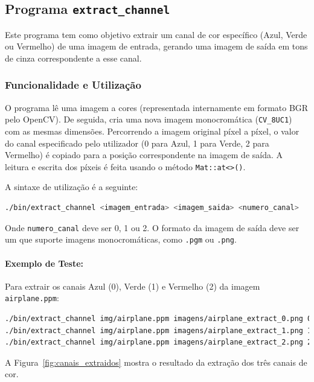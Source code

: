 \documentclass[a4paper, 11pt, portuguese]{article}
\begin{document}
\subsection{Programa \texttt{extract\_channel}}

Este programa tem como objetivo extrair um canal de cor específico (Azul, Verde ou Vermelho) de uma imagem de entrada, gerando uma imagem de saída em tons de cinza correspondente a esse canal.

\subsubsection{Funcionalidade e Utilização}
O programa lê uma imagem a cores (representada internamente em formato BGR pelo OpenCV). De seguida, cria uma nova imagem monocromática (\texttt{CV\_8UC1}) com as mesmas dimensões. Percorrendo a imagem original píxel a píxel, o valor do canal especificado pelo utilizador (0 para Azul, 1 para Verde, 2 para Vermelho) é copiado para a posição correspondente na imagem de saída. A leitura e escrita dos píxeis é feita usando o método \texttt{Mat::at<>()}.

A sintaxe de utilização é a seguinte:
\begin{lstlisting}[language=bash, caption=Sintaxe de Uso do extract\_channel]
./bin/extract_channel <imagem_entrada> <imagem_saida> <numero_canal>
\end{lstlisting}
Onde \texttt{numero\_canal} deve ser 0, 1 ou 2. O formato da imagem de saída deve ser um que suporte imagens monocromáticas, como \texttt{.pgm} ou \texttt{.png}.

\paragraph{Exemplo de Teste:}
Para extrair os canais Azul (0), Verde (1) e Vermelho (2) da imagem \texttt{airplane.ppm}:
\begin{lstlisting}[language=bash]
./bin/extract_channel img/airplane.ppm imagens/airplane_extract_0.png 0
./bin/extract_channel img/airplane.ppm imagens/airplane_extract_1.png 1
./bin/extract_channel img/airplane.ppm imagens/airplane_extract_2.png 2
\end{lstlisting}

A Figura~\ref{fig:canais_extraidos} mostra o resultado da extração dos três canais de cor.
\end{document}
